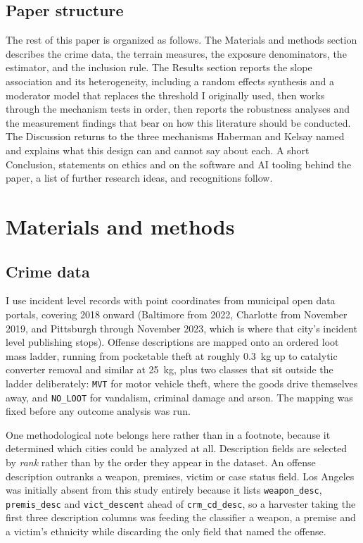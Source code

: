\documentclass[11pt,letterpaper]{article}
\begin{document}
\subsection{Paper structure}

The rest of this paper is organized as follows. The Materials and methods section
describes the crime data, the terrain measures, the exposure denominators, the
estimator, and the inclusion rule. The Results section reports the slope association
and its heterogeneity, including a random effects synthesis and a moderator model
that replaces the threshold I originally used, then works through the mechanism
tests in order, then reports the robustness analyses and the measurement findings
that bear on how this literature should be conducted. The Discussion returns to the
three mechanisms Haberman and Kelsay named and explains what this design can and
cannot say about each. A short Conclusion, statements on ethics and on the software
and AI tooling behind the paper, a list of further research ideas, and recognitions
follow.

\section{Materials and methods}

\subsection{Crime data}

I use incident level records with point coordinates from municipal open data portals,
covering 2018 onward (Baltimore from 2022, Charlotte from November 2019, and
Pittsburgh through November 2023, which is where that city's incident level
publishing stops). Offense descriptions are mapped onto an ordered loot mass ladder,
running from pocketable theft at roughly 0.3~kg up to catalytic converter removal and
similar at 25~kg, plus two classes that sit outside the ladder deliberately:
\texttt{MVT} for motor vehicle theft, where the goods drive themselves away, and
\texttt{NO\_LOOT} for vandalism, criminal damage and arson. The mapping was fixed
before any outcome analysis was run.

One methodological note belongs here rather than in a footnote, because it determined
which cities could be analyzed at all. Description fields are selected by \emph{rank}
rather than by the order they appear in the dataset. An offense description outranks
a weapon, premises, victim or case status field. Los Angeles was initially absent from
this study entirely because it lists \texttt{weapon\_desc}, \texttt{premis\_desc} and
\texttt{vict\_descent} ahead of \texttt{crm\_cd\_desc}, so a harvester taking the
first three description columns was feeding the classifier a weapon, a premise and a
victim's ethnicity while discarding the only field that named the offense.
\end{document}
